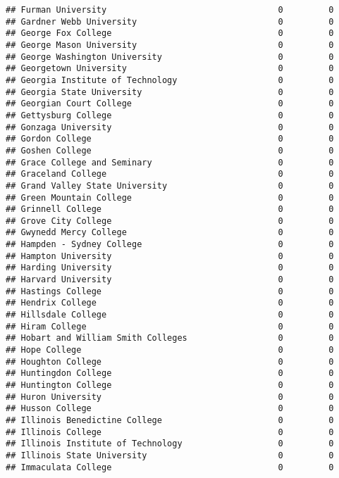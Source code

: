 \documentclass[
]{article}
\begin{document}
\begin{verbatim}
## Furman University                                  0         0
## Gardner Webb University                            0         0
## George Fox College                                 0         0
## George Mason University                            0         0
## George Washington University                       0         0
## Georgetown University                              0         0
## Georgia Institute of Technology                    0         0
## Georgia State University                           0         0
## Georgian Court College                             0         0
## Gettysburg College                                 0         0
## Gonzaga University                                 0         0
## Gordon College                                     0         0
## Goshen College                                     0         0
## Grace College and Seminary                         0         0
## Graceland College                                  0         0
## Grand Valley State University                      0         0
## Green Mountain College                             0         0
## Grinnell College                                   0         0
## Grove City College                                 0         0
## Gwynedd Mercy College                              0         0
## Hampden - Sydney College                           0         0
## Hampton University                                 0         0
## Harding University                                 0         0
## Harvard University                                 0         0
## Hastings College                                   0         0
## Hendrix College                                    0         0
## Hillsdale College                                  0         0
## Hiram College                                      0         0
## Hobart and William Smith Colleges                  0         0
## Hope College                                       0         0
## Houghton College                                   0         0
## Huntingdon College                                 0         0
## Huntington College                                 0         0
## Huron University                                   0         0
## Husson College                                     0         0
## Illinois Benedictine College                       0         0
## Illinois College                                   0         0
## Illinois Institute of Technology                   0         0
## Illinois State University                          0         0
## Immaculata College                                 0         0

\end{verbatim}
\end{document}
